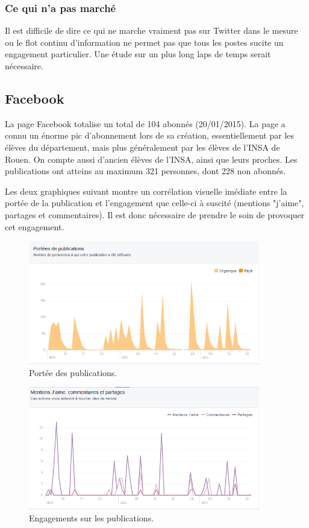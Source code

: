\subsubsection{Ce qui n'a pas marché}
Il est difficile de dire ce qui ne marche vraiment pas sur Twitter dans le mesure ou le flot continu d'information ne permet pas que tous les postes sucite un engagement particulier. Une étude sur un plus long laps de temps serait nécessaire.
\subsection{Facebook}

La page Facebook totalise un total de 104 abonnés (20/01/2015). La page a connu un énorme pic d'abonnement lors de sa création, essentiellement par les élèves du département, mais plus généralement par les élèves de l'INSA de Rouen. On compte aussi d'ancien élèves de l'INSA, ainsi que leurs proches. Les publications ont atteins au maximum 321 personnes, dont 228 non abonnés.

Les deux graphiques suivant montre un corrélation visuelle imédiate entre la portée de la publication et l'engagement que celle-ci à suscité (mentions "j'aime", partages et commentaires). Il est donc nécessaire de prendre le soin de provoquer cet engagement. 
\begin{figure}
	\begin{center}
		\includegraphics[width=0.90\textwidth]{images/PorteeDesPublication.png}
		\caption{Portée des publications.}
	\end{center}
\end{figure}


\begin{figure}
	\begin{center}
		\includegraphics[width=0.90\textwidth]{images/Engagements.png}
		\caption{Engagements sur les publications.}
	\end{center}
\end{figure}


